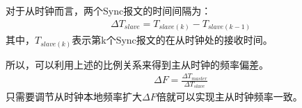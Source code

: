 对于从时钟而言，两个Sync报文的时间间隔为：
\begin{align}
	\Delta T_{slave} = T_{slave(k)} - T_{slave(k - 1)}
\end{align}
其中，$T_{slave(k)}$表示第k个Sync报文的在从时钟处的接收时间。

所以，可以利用上述的比例关系来得到主从时钟的频率偏差。
\begin{align}
	\Delta F = \frac{\Delta T_{master}}{\Delta T_{slave}}
\end{align}
只需要调节从时钟本地频率扩大$\Delta F$倍就可以实现主从时钟频率一致。




